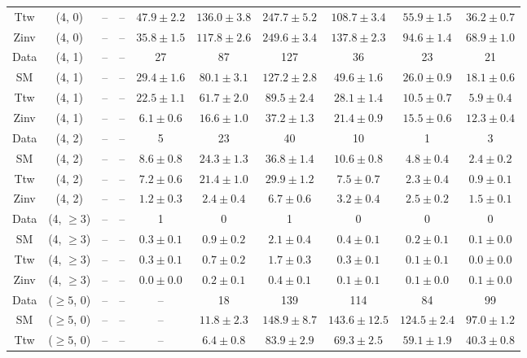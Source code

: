 \begin{table}[h!]
{\begin{tabular}{cccccccccc}
	Ttw & (4, 0) & -- & -- & $47.9\pm 2.2$ & $136.0\pm 3.8$ & $247.7\pm 5.2$ & $108.7\pm 3.4$ & $55.9\pm 1.5$ & $36.2\pm 0.7$ \\[0.5ex] 
	Zinv & (4, 0) & -- & -- & $35.8\pm 1.5$ & $117.8\pm 2.6$ & $249.6\pm 3.4$ & $137.8\pm 2.3$ & $94.6\pm 1.4$ & $68.9\pm 1.0$ \\[0.5ex] 
	Data & (4, 1) & -- & -- & 27 & 87 & 127 & 36 & 23 & 21 \\[0.5ex] 
	SM & (4, 1) & -- & -- & $29.4\pm 1.6$ & $80.1\pm 3.1$ & $127.2\pm 2.8$ & $49.6\pm 1.6$ & $26.0\pm 0.9$ & $18.1\pm 0.6$ \\[0.5ex] 
	Ttw & (4, 1) & -- & -- & $22.5\pm 1.1$ & $61.7\pm 2.0$ & $89.5\pm 2.4$ & $28.1\pm 1.4$ & $10.5\pm 0.7$ & $5.9\pm 0.4$ \\[0.5ex] 
	Zinv & (4, 1) & -- & -- & $6.1\pm 0.6$ & $16.6\pm 1.0$ & $37.2\pm 1.3$ & $21.4\pm 0.9$ & $15.5\pm 0.6$ & $12.3\pm 0.4$ \\[0.5ex] 
	Data & (4, 2) & -- & -- & 5 & 23 & 40 & 10 & 1 & 3 \\[0.5ex] 
	SM & (4, 2) & -- & -- & $8.6\pm 0.8$ & $24.3\pm 1.3$ & $36.8\pm 1.4$ & $10.6\pm 0.8$ & $4.8\pm 0.4$ & $2.4\pm 0.2$ \\[0.5ex] 
	Ttw & (4, 2) & -- & -- & $7.2\pm 0.6$ & $21.4\pm 1.0$ & $29.9\pm 1.2$ & $7.5\pm 0.7$ & $2.3\pm 0.4$ & $0.9\pm 0.1$ \\[0.5ex] 
	Zinv & (4, 2) & -- & -- & $1.2\pm 0.3$ & $2.4\pm 0.4$ & $6.7\pm 0.6$ & $3.2\pm 0.4$ & $2.5\pm 0.2$ & $1.5\pm 0.1$ \\[0.5ex] 
	Data & (4, $\ge3$) & -- & -- & 1 & 0 & 1 & 0 & 0 & 0 \\[0.5ex] 
	SM & (4, $\ge3$) & -- & -- & $0.3\pm 0.1$ & $0.9\pm 0.2$ & $2.1\pm 0.4$ & $0.4\pm 0.1$ & $0.2\pm 0.1$ & $0.1\pm 0.0$ \\[0.5ex] 
	Ttw & (4, $\ge3$) & -- & -- & $0.3\pm 0.1$ & $0.7\pm 0.2$ & $1.7\pm 0.3$ & $0.3\pm 0.1$ & $0.1\pm 0.1$ & $0.0\pm 0.0$ \\[0.5ex] 
	Zinv & (4, $\ge3$) & -- & -- & $0.0\pm 0.0$ & $0.2\pm 0.1$ & $0.4\pm 0.1$ & $0.1\pm 0.1$ & $0.1\pm 0.0$ & $0.1\pm 0.0$ \\[0.5ex] 
	Data & ($\ge5$, 0) & -- & -- & -- & 18 & 139 & 114 & 84 & 99 \\[0.5ex] 
	SM & ($\ge5$, 0) & -- & -- & -- & $11.8\pm 2.3$ & $148.9\pm 8.7$ & $143.6\pm 12.5$ & $124.5\pm 2.4$ & $97.0\pm 1.2$ \\[0.5ex] 
	Ttw & ($\ge5$, 0) & -- & -- & -- & $6.4\pm 0.8$ & $83.9\pm 2.9$ & $69.3\pm 2.5$ & $59.1\pm 1.9$ & $40.3\pm 0.8$ \\[0.5ex] 

\end{tabular}}
\end{table}
